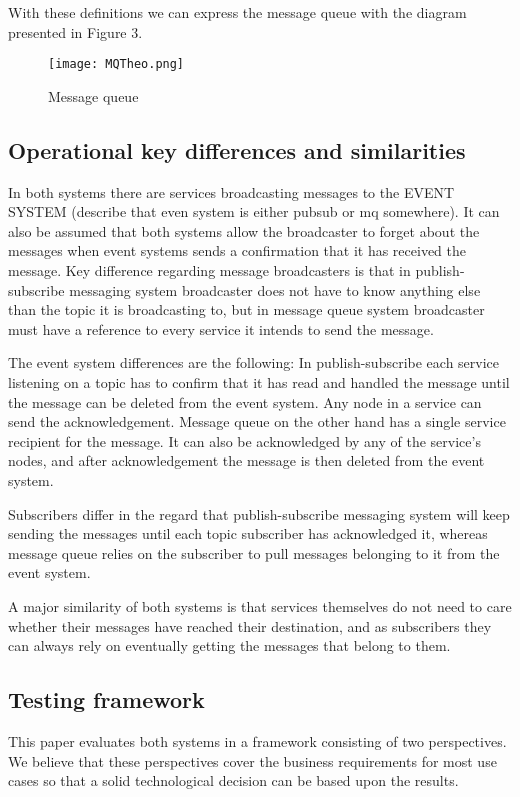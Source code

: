 \documentclass[conference]{IEEEtran}
\begin{document}
With these definitions we can express the message queue with the diagram presented in Figure 3.
\begin{figure}[h]
    \centering
    \texttt{[image: MQTheo.png]}
    \caption{Message queue}
\end{figure}



\subsection{Operational key differences and similarities}
In both systems there are services broadcasting messages to the EVENT SYSTEM (describe that even system is either pubsub or mq somewhere). It can also be assumed that both systems allow the broadcaster to forget about the messages when event systems sends a confirmation that it has received the message. Key difference regarding message broadcasters is that in publish-subscribe messaging system broadcaster does not have to know anything else than the topic it is broadcasting to, but in message queue system broadcaster must have a reference to every service it intends to send the message.

The event system differences are the following: In publish-subscribe each service listening on a topic has to confirm that it has read and handled the message until the message can be deleted from the event system. Any node in a service can send the acknowledgement. Message queue on the other hand has a single service recipient for the message. It can also be acknowledged by any of the service’s nodes, and after acknowledgement the message is then deleted from the event system.

Subscribers differ in the regard that publish-subscribe messaging system will keep sending the messages until each topic subscriber has acknowledged it, whereas message queue relies on the subscriber to pull messages belonging to it from the event system.

A major similarity of both systems is that services themselves do not need to care whether their messages have reached their destination, and as subscribers they can always rely on eventually getting the messages that belong to them.

\subsection{Testing framework}
This paper evaluates both systems in a framework consisting of two perspectives. We believe that these perspectives cover the business requirements for most use cases so that a solid technological decision can be based upon the results.
\end{document}
